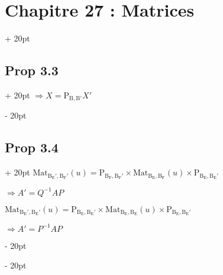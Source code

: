 \documentclass[12pt]{article}
\newcommand{\ind}[1][20pt]{\advance\leftskip + #1}
\newcommand{\deind}[1][20pt]{\advance\leftskip - #1}
\newenvironment{indt}[2][20pt]{#2 \par \ind[#1]}{\par \deind}
\begin{document}
\begin{indt}{\section*{Chapitre 27 : Matrices}}
\begin{indt}{\subsection*{Prop 3.3}}
            $\Rightarrow X=\mathrm{P_{B,B'}}X'$
        \end{indt} 

        \begin{indt}{\subsection*{Prop 3.4}}
            $\mathrm{Mat_{B_E',B_F'}}(u)=\mathrm{P_{B_F,B_F'}}\times\mathrm{Mat_{B_E,B_F}}(u)\times\mathrm{P_{B_E,B_E'}}$

            $\Rightarrow A'=Q^{-1}AP$

            $\mathrm{Mat_{B_E',B_E'}}(u)=\mathrm{P_{B_E,B_E'}}\times\mathrm{Mat_{B_E,B_E}}(u)\times\mathrm{P_{B_E,B_E'}}$

            $\Rightarrow A'=P^{-1}AP$
        \end{indt}
    \end{indt}
\end{document}
